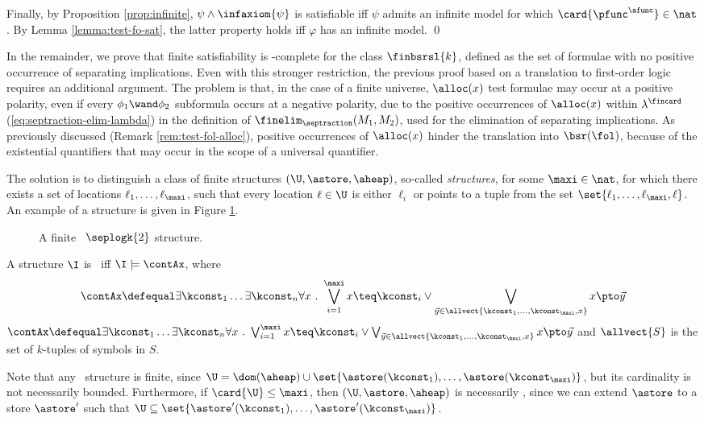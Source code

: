   Finally, by Proposition \ref{prop:infinite}, $\psi \wedge
  \infaxiom{\psi}$ is satisfiable iff $\psi$ admits an infinite model
  for which $\card{\pfunc^\afunc} \in \nat$.  By Lemma
  \ref{lemma:test-fo-sat}, the latter property holds iff $\varphi$ has
  an infinite model. \qed

In the remainder, we prove that finite satisfiability
is \pspace-complete for the class $\finbsrsl{k}$, defined as the set
of formulae with no positive occurrence of separating
implications. Even with this stronger restriction, the previous proof
based on a translation to first-order logic requires an additional
argument. The problem is that, in the case of a finite universe,
$\alloc(x)$ test formulae may occur at a positive polarity, even if
every $\phi_1 \wand \phi_2$ subformula occurs at a negative polarity,
due to the positive occurrences of $\alloc(x)$ within
$\lambda^\fincard$ (\ref{eq:septraction-elim-lambda}) in the
definition of $\finelim_\septraction(M_1,M_2)$, used for the
elimination of separating implications. As previously discussed
(Remark \ref{rem:test-fol-alloc}), positive occurrences of $\alloc(x)$
hinder the translation into $\bsr(\fol)$, because of the existential
quantifiers that may occur in the scope of a universal quantifier.

The solution is to distinguish a class of finite structures
$(\U,\astore,\aheap)$, so-called \emph{{\controlled} structures}, for
some $\maxi \in \nat$, for which there exists a set of locations
$\ell_1,\ldots,\ell_\maxi$, such that every location $\ell \in \U$ is
either $\ell_i$ or points to a tuple from the set $\set{\ell_1,
  \ldots, \ell_\maxi,\ell}$. An example of a  structure
is given in Figure \ref{fig:controlled}.

\begin{figure}[thb]
  \centerline{}
  \caption{A finite \ $\seplogk{2}$
    structure.}\label{fig:controlled}
  \vspace*{-\baselineskip}
\end{figure}  

\begin{definition}\label{def:controlled}
  A structure $\I$ is \controlled\ iff $\I \models \contAx$, where
  \ifLongVersion
  \[\contAx \defequal \exists \kconst_1 \ldots \exists \kconst_n
  \forall x ~.~ \bigvee_{i=1}^\maxi x \teq \kconst_i \vee
  \bigvee_{\vec{y} \in \allvect{\kconst_1,\ldots,\kconst_\maxi,x}} x
  \pto \vec{y}\] \else \(\contAx \defequal \exists \kconst_1 \ldots
  \exists \kconst_n \forall x ~.~ \bigvee_{i=1}^\maxi x \teq \kconst_i
  \vee \bigvee_{\vec{y} \in
    \allvect{\kconst_1,\ldots,\kconst_\maxi,x}} x \pto \vec{y}\)\fi
  and $\allvect{S}$ is the set of $k$-tuples of symbols in $S$.
\end{definition}
Note that any \controlled\ structure is finite, since $\U =
\dom(\aheap) \cup \set{\astore(\kconst_1), \ldots,
  \astore(\kconst_\maxi)}$, but its cardinality is not necessarily
bounded. Furthermore, if $\card{\U} \leq \maxi$, then
$(\U,\astore,\aheap)$ is necessarily \controlled, since we can
extend $\astore$ to a store $\astore'$ such that $\U \subseteq
\set{\astore'(\kconst_1), \ldots, \astore'(\kconst_\maxi)}$.

